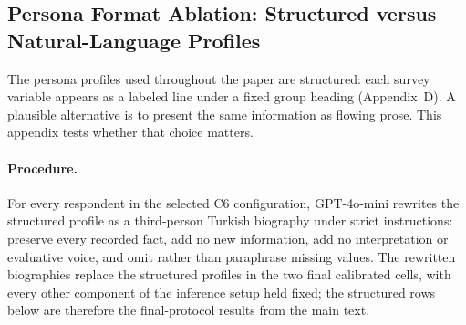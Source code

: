 %
%

\subsection{Persona Format Ablation: Structured versus Natural-Language
Profiles}
\label{app:natural}

The persona profiles used throughout the paper are structured: each survey
variable appears as a labeled line under a fixed group heading
(Appendix~D). A plausible alternative is to present the same information as
flowing prose. This appendix tests whether that choice matters.

\paragraph{Procedure.} For every respondent in the selected C6
configuration, GPT-4o-mini rewrites the structured profile as a third-person
Turkish biography under strict instructions: preserve every recorded fact,
add no new information, add no interpretation or evaluative voice, and omit
rather than paraphrase missing values. The rewritten biographies replace the
structured profiles in the two final calibrated cells, with every other
component of the inference setup held fixed; the structured rows below are
therefore the final-protocol results from the main text.

